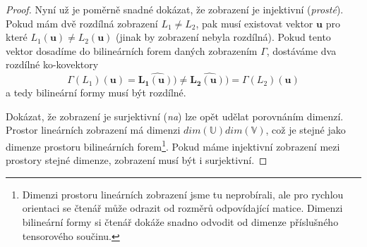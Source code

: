 \documentclass[a5paper,12pt]{amsbook}
\theoremstyle{definition}
\newcommand{\myvec}[1]{\mathbf{#1}}
\newcommand{\myspace}[1]{\mathbb{#1}}
\newcommand{\mycocovec}[1]{\myvec{\widehat{#1}}}
\begin{document}
\begin{proof}
Nyní už je poměrně snadné dokázat, že zobrazení je injektivní (\textit{prosté}). Pokud mám
dvě rozdílná zobrazení $L_1 \neq L_2$, pak musí existovat vektor $\myvec{u}$ pro které
$L_1(\myvec{u}) \neq L_2(\myvec{u})$ (jinak by zobrazení nebyla rozdílná). Pokud tento vektor
dosadíme do bilineárních forem daných zobrazením $\Gamma$, dostáváme dva rozdílné ko-kovektory 
\begin{equation*}
\Gamma(L_1)(\myvec{u}) = \mycocovec{L_1(\myvec{u}))} \neq
    \mycocovec{L_2(\myvec{u}))} = \Gamma(L_2)(\myvec{u})
\end{equation*}
a tedy bilineární formy musí být rozdílné.

Dokázat, že zobrazení je surjektivní (\textit{na}) lze opět udělat porovnáním dimenzí. Prostor
lineárních zobrazení má dimenzi $dim(\myspace{U})dim(\myspace{V})$, což je stejné jako dimenze
prostoru bilineárních forem\footnote{
    Dimenzi prostoru lineárních zobrazení jsme tu neprobírali, ale pro rychlou orientaci se
    čtenář může odrazit od rozměrů odpovídající matice. Dimenzi bilineární formy si čtenář
    dokáže snadno odvodit od dimenze příslušného tensorového součinu.
}. Pokud máme injektivní zobrazení mezi prostory stejné dimenze, zobrazení musí být i surjektivní.
\end{proof}
\end{document}
